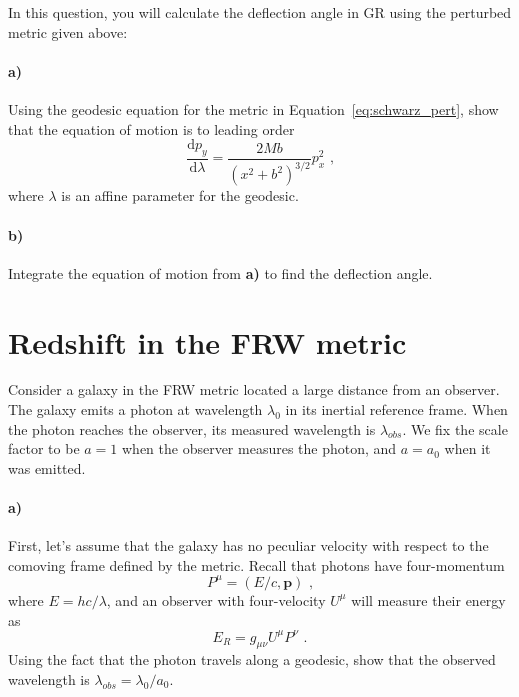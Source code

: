 \documentclass[12pt]{article}
\newcommand\diff{\mathrm{d}}
\begin{document}
In this question, you will calculate the deflection angle in GR using the
perturbed metric given above:

\paragraph{a)} Using the geodesic equation for the metric in
Equation~\ref{eq:schwarz_pert}, show that the equation of motion is to leading
order
\begin{equation}
    \frac{\diff p_y}{\diff \lambda}
    = \frac{2 M b}{\left(x^2 + b^2\right)^{3/2}} p_x^2 \text{ ,}
\end{equation}
where $\lambda$ is an affine parameter for the geodesic.

\paragraph{b)} Integrate the equation of motion from \textbf{a)} to find the
deflection angle.

\section{Redshift in the FRW metric}

Consider a galaxy in the FRW metric located a large distance from an observer.
The galaxy emits a photon at wavelength $\lambda_0$ in its inertial reference
frame. When the photon reaches the observer, its measured wavelength is
$\lambda_{obs}$. We fix the scale factor to be $a=1$ when the observer measures
the photon, and $a=a_0$ when it was emitted.

\paragraph{a)} First, let's assume that the galaxy has no peculiar velocity with
respect to the comoving frame defined by the metric. Recall that photons have
four-momentum
\begin{equation}
    P^\mu = \left(E / c, \mathbf{p}\right) \text{ ,}
\end{equation}
where $E = hc / \lambda$, and an observer with four-velocity $U^\mu$ will
measure their energy as
\begin{equation}
    E_R = g_{\mu \nu} U^\mu P^\nu \text{ .}
\end{equation}
Using the fact that the photon travels along a
geodesic, show that the observed wavelength is $\lambda_{obs} = \lambda_0 /
a_0$.
\end{document}
